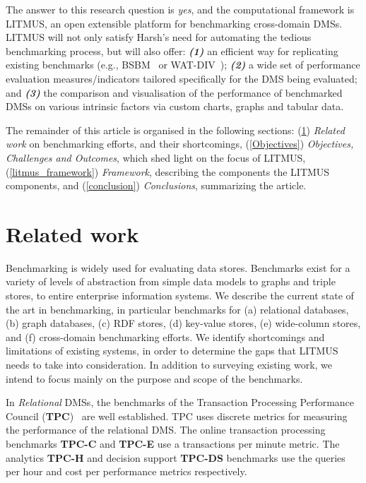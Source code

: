 \documentclass{llncs}
\begin{document}
{{    The answer to this research question is \textit{yes}, and the computational framework is LITMUS, an open extensible platform for benchmarking cross-domain DMSs.
    LITMUS will not only satisfy Harsh’s need for automating the tedious benchmarking process, but will also offer: \textit{\textbf{(1)}} an efficient way for replicating existing benchmarks (e.g., BSBM~\cite{Bizer2009TheBS} or WAT-DIV~\cite{alucc2014diversified}); \textit{\textbf{(2)}} a wide set of performance evaluation measures/indicators tailored specifically for the DMS being evaluated; and \textit{\textbf{(3)}} the comparison and visualisation of the performance of benchmarked DMSs on various intrinsic factors via custom charts, graphs and tabular data.}}%

 
The remainder of this article is organised in the following sections: 
(\ref{relwork}) \textit{Related work} on benchmarking efforts, and their shortcomings, 
(\ref{Objectives}) \textit{Objectives, Challenges and Outcomes}, which shed light on the focus of LITMUS,
(\ref{litmus_framework}) \textit{Framework}, describing the components the LITMUS components, and
(\ref{conclusion}) \textit{Conclusions}, summarizing the article.

\section{Related work}\label{relwork}

Benchmarking is widely used for evaluating data stores. 
Benchmarks exist for a variety of levels of abstraction from simple data models to graphs and triple stores, to entire enterprise information systems.
We describe the current state of the art in benchmarking, in particular benchmarks for (a) relational databases, (b) graph databases, (c) RDF stores, (d) key-value stores, (e) wide-column stores, and (f) cross-domain benchmarking efforts.
We identify shortcomings and limitations of existing systems, in order to determine the gaps that LITMUS needs to take into consideration.
In addition to surveying existing work, we intend to focus mainly on the purpose and scope of the benchmarks.
    
    In \textit{Relational} DMSs, the benchmarks of the Transaction Processing Performance Council (\textbf{TPC})~\cite{Nambiar2011} are well established.
    TPC uses discrete metrics for measuring the performance of the relational DMS.
    The online transaction processing benchmarks \textbf{TPC-C} and \textbf{TPC-E} use a transactions per minute metric.
    The analytics \textbf{TPC-H} and decision support \textbf{TPC-DS} benchmarks use the queries per hour and cost per performance metrics respectively.
    
\end{document}
